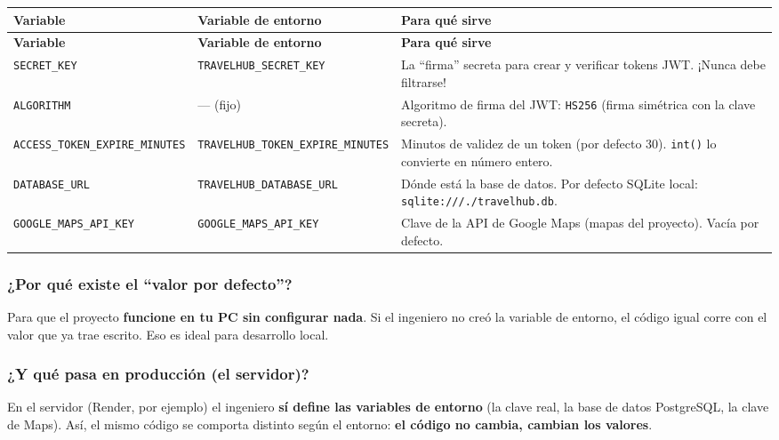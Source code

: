 \documentclass[11pt,a4paper]{article}
\begin{document}
{\footnotesize
\setlength{\tabcolsep}{4pt}
\begin{longtable}{@{}>{\raggedright\arraybackslash}p{4.9cm}>{\raggedright\arraybackslash}p{5.5cm}>{\raggedright\arraybackslash}p{5cm}@{}}
\toprule
\textbf{Variable} & \textbf{Variable de entorno} & \textbf{Para qué sirve} \\
\midrule
\endfirsthead
\toprule
\textbf{Variable} & \textbf{Variable de entorno} & \textbf{Para qué sirve} \\
\midrule
\endhead
\texttt{SECRET\_KEY} & \texttt{TRAVELHUB\_SECRET\_KEY} & La ``firma'' secreta para crear y verificar tokens JWT. ¡Nunca debe filtrarse! \\
\texttt{ALGORITHM} & --- (fijo) & Algoritmo de firma del JWT: \texttt{HS256} (firma simétrica con la clave secreta). \\
\texttt{ACCESS\_TOKEN\_EXPIRE\_MINUTES} & \texttt{TRAVELHUB\_TOKEN\_EXPIRE\_MINUTES} & Minutos de validez de un token (por defecto 30). \texttt{int()} lo convierte en número entero. \\
\texttt{DATABASE\_URL} & \texttt{TRAVELHUB\_DATABASE\_URL} & Dónde está la base de datos. Por defecto SQLite local: \texttt{sqlite:///./travelhub.db}. \\
\texttt{GOOGLE\_MAPS\_API\_KEY} & \texttt{GOOGLE\_MAPS\_API\_KEY} & Clave de la API de Google Maps (mapas del proyecto). Vacía por defecto. \\
\bottomrule
\end{longtable}
}

\subsubsection{¿Por qué existe el ``valor por defecto''?}

Para que el proyecto \textbf{funcione en tu PC sin configurar nada}. Si el ingeniero no creó
la variable de entorno, el código igual corre con el valor que ya trae escrito. Eso es ideal
para desarrollo local.

\subsubsection{¿Y qué pasa en producción (el servidor)?}

En el servidor (Render, por ejemplo) el ingeniero \textbf{sí define las variables de entorno}
(la clave real, la base de datos PostgreSQL, la clave de Maps). Así, el mismo código se comporta
distinto según el entorno: \textbf{el código no cambia, cambian los valores}.
\end{document}
